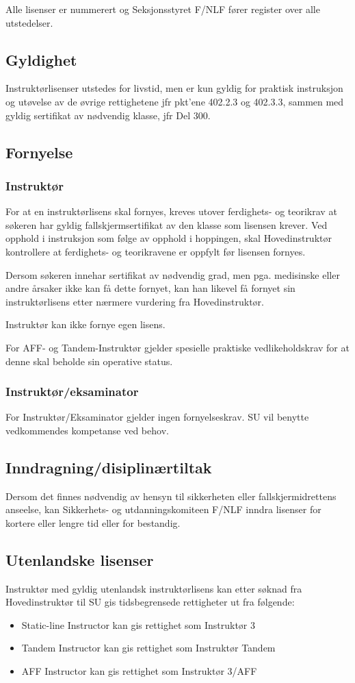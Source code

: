 Alle lisenser er nummerert og Seksjonsstyret F/NLF fører register over alle utstedelser.

\subsection{Gyldighet}
Instruktørlisenser utstedes for livstid, men er kun gyldig for praktisk instruksjon og utøvelse av de øvrige rettighetene jfr pkt'ene 402.2.3 og 402.3.3, sammen med gyldig sertifikat av nødvendig klasse, jfr Del 300.

\subsection{Fornyelse}
\subsubsection{Instruktør}
For at en instruktørlisens skal fornyes, kreves utover ferdighets- og teorikrav at søkeren har gyldig fallskjermsertifikat av den klasse som lisensen krever. Ved opphold i instruksjon som følge av opphold i hoppingen, skal Hovedinstruktør kontrollere at ferdighets- og teorikravene er oppfylt før lisensen fornyes.

Dersom søkeren innehar sertifikat av nødvendig grad, men pga. medisinske eller andre årsaker ikke kan få dette fornyet, kan han likevel få fornyet sin instruktørlisens etter nærmere vurdering fra Hovedinstruktør.

Instruktør kan ikke fornye egen lisens.

For AFF- og Tandem-Instruktør gjelder spesielle praktiske vedlikeholdskrav for at denne skal beholde sin operative status.

\subsubsection{Instruktør/eksaminator}
For Instruktør/Eksaminator gjelder ingen fornyelseskrav. SU vil benytte vedkommendes kompetanse ved behov.

\subsection{Inndragning/disiplinærtiltak}
Dersom det finnes nødvendig av hensyn til sikkerheten eller fallskjermidrettens anseelse, kan Sikkerhets- og utdanningskomiteen F/NLF inndra lisenser for kortere eller lengre tid eller for bestandig.

\subsection{Utenlandske lisenser}
Instruktør med gyldig utenlandsk instruktørlisens kan etter søknad fra Hovedinstruktør til SU gis tidsbegrensede rettigheter ut fra følgende:
\begin{itemize}
	\item Static-line Instructor kan gis rettighet som Instruktør 3
	\item Tandem Instructor kan gis rettighet som Instruktør Tandem
	\item AFF Instructor kan gis rettighet som Instruktør 3/AFF
\end{itemize}

